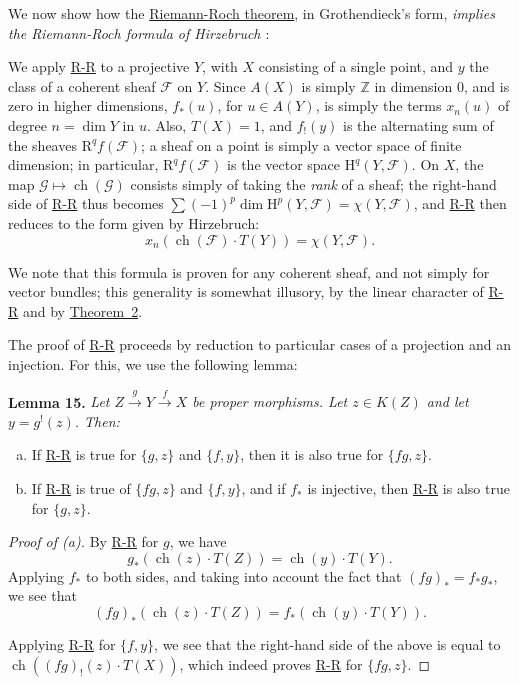 \documentclass{article}
\newenvironment{itenv}[1]
  {\phantomsection\par\medskip\noindent\textbf{#1.}\itshape}
  {\medskip}
\newcommand{\scr}[1]{{\mathscr{#1}}}
\newcommand{\HH}{\mathrm{H}}
\newcommand{\RR}{\mathrm{R}}
\DeclareMathOperator{\ch}{ch}
\newcommand{\oldpage}[1]{\marginpar{\footnotesize$\Big\vert$ \textit{p.~#1}}}
\begin{document}
We now show how the \hyperref[theoremriemannroch]{Riemann-Roch theorem}, in Grothendieck's form, \emph{implies the Riemann-Roch formula of Hirzebruch \cite{9}}:

We apply \hyperref[theoremriemannroch]{R-R} to a projective $Y$, with $X$ consisting of a single point, and $y$ the class of a coherent sheaf $\scr{F}$ on $Y$.
Since $A(X)$ is simply $\mathbb{Z}$ in dimension $0$, and is zero in higher dimensions, $f_*(u)$, for $u\in A(Y)$, is simply the terms $x_n(u)$ of degree $n=\dim Y$ in $u$.
Also, $T(X)=1$, and $f_!(y)$ is the alternating sum of the sheaves $\RR^qf(\scr{F})$;
a sheaf on a point is simply a vector space of finite dimension;
in particular, $\RR^qf(\scr{F})$ is the vector space $\HH^q(Y,\scr{F})$.
On $X$, the map $\scr{G}\mapsto\ch(\scr{G})$ consists simply of taking the \emph{rank} of a sheaf;
the right-hand side of \hyperref[theoremriemannroch]{R-R} thus becomes $\sum(-1)^p\dim\HH^p(Y,\scr{F}) = \chi(Y,\scr{F})$, and \hyperref[theoremriemannroch]{R-R} then reduces to the form given by Hirzebruch:
\[
  x_n(\ch(\scr{F})\cdot T(Y)) = \chi(Y,\scr{F}).
\]

We note that this formula is proven for any coherent sheaf, and not simply for vector bundles;
this generality is somewhat illusory, by the linear character of \hyperref[theoremriemannroch]{R-R} and by \hyperref[theorem2]{Theorem~2}.

The proof of \hyperref[theoremriemannroch]{R-R} proceeds by reduction to particular cases of a projection and an injection.
For this, we use the following lemma:

\begin{itenv}{Lemma 15}
\label{lemma15}
  Let $Z\xrightarrow{g}Y\xrightarrow{f}X$ be proper morphisms.
  Let $z\in K(Z)$ and let $y=g^!(z)$. Then:
  \begin{enumerate}[(a)]
    \item If \hyperref[theoremriemannroch]{R-R} is true for $\{g,z\}$ and $\{f,y\}$, then it is also true for $\{fg,z\}$.
    \item If \hyperref[theoremriemannroch]{R-R} is true of $\{fg,z\}$ and $\{f,y\}$, and if $f_*$ is injective, then \hyperref[theoremriemannroch]{R-R} is also true for $\{g,z\}$.
  \end{enumerate}
\end{itenv}

\begin{proof}[Proof of (a)]
  By \hyperref[theoremriemannroch]{R-R} for $g$, we have
  \[
    g_*(\ch(z)\cdot T(Z)) = \ch(y)\cdot T(Y).
  \]
  \oldpage{114}
  Applying $f_*$ to both sides, and taking into account the fact that $(fg)_*=f_*g_*$, we see that
  \[
    (fg)_*(\ch(z)\cdot T(Z)) = f_*(\ch(y)\cdot T(Y)).
  \]

  Applying \hyperref[theoremriemannroch]{R-R} for $\{f,y\}$, we see that the right-hand side of the above is equal to $\ch((fg)_!(z)\cdot T(X))$, which indeed proves \hyperref[theoremriemannroch]{R-R} for $\{fg,z\}$.
\end{proof}
\end{document}

